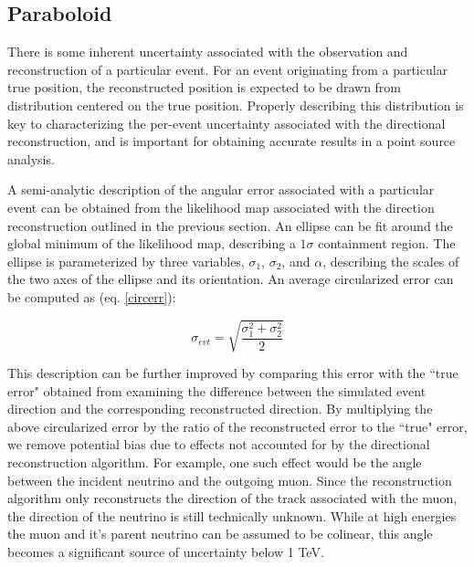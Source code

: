 \subsection{Paraboloid}
There is some inherent uncertainty associated with the observation and reconstruction of a particular event. For an event originating from a particular true position, the reconstructed position is expected to be drawn from distribution centered on the true position. Properly describing this distribution is key to characterizing the per-event uncertainty associated with the directional reconstruction, and is important for obtaining accurate results in a point source analysis.

A semi-analytic description of the angular error associated with a particular event can be obtained from the likelihood map associated with the direction reconstruction outlined in the previous section. An ellipse can be fit around the global minimum of the likelihood map, describing a $1 \sigma$ containment region. The ellipse is parameterized by three variables, $\sigma_1$, $\sigma_2$, and $\alpha$, describing the scales of the two axes of the ellipse and its orientation. An average circularized error can be computed as (eq. \ref{circerr})\cite{paraboloidpaper}:

\begin{equation}
    \sigma_{evt} = \sqrt{\frac{\sigma_1^2 + \sigma_2^2}{2}}
\label{circerr}
\end{equation}

This description can be further improved by comparing this error with the ``true error" obtained from examining the difference between the simulated event direction and the corresponding reconstructed direction. By multiplying the above circularized error by the ratio of the reconstructed error to the ``true" error, we remove potential bias due to effects not accounted for by the directional reconstruction algorithm. For example, one such effect would be the angle between the incident neutrino and the outgoing muon. Since the reconstruction algorithm only reconstructs the direction of the track associated with the muon, the direction of the neutrino is still technically unknown. While at high energies the muon and it's parent neutrino can be assumed to be colinear, this angle becomes a significant source of uncertainty below 1 TeV. 

